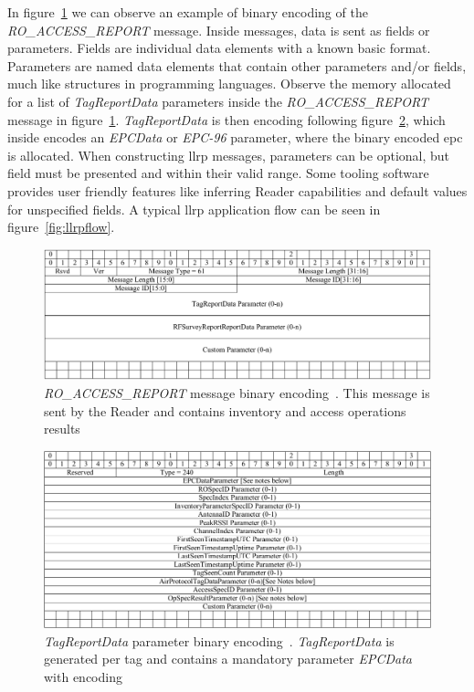 In figure~\ref{fig:ROACCESSREPORTbin} we can observe an example of binary encoding of the \textit{RO\_ACCESS\_REPORT} message.
Inside messages, data is sent as fields or parameters.
Fields are individual data elements with a known basic format.
Parameters are named data elements that contain other parameters and/or fields, much like structures in programming languages.
Observe the memory allocated for a list of \textit{TagReportData} parameters inside the \textit{RO\_ACCESS\_REPORT} message in figure~\ref{fig:ROACCESSREPORTbin}. \textit{TagReportData} is then encoding following figure~\ref{fig:TagReportDatabin}, which inside encodes an \textit{EPCData} or \textit{EPC-96} parameter, where the binary encoded \ac{epc} is allocated.
When constructing \ac{llrp} messages, parameters can be optional, but field must be presented and within their valid range. Some tooling software provides user friendly features like inferring Reader capabilities and default values for unspecified fields.
A typical \ac{llrp} application flow can be seen in figure~\ref{fig:llrpflow}.

\begin{figure}[]
    \centering
    \includegraphics[width=\textwidth]{./figs/02-state-of-the-art/RO_ACCESS_REPORT_bin.pdf}
    \caption{\textit{RO\_ACCESS\_REPORT} message binary encoding~\cite{LowLevelReader}. This message is sent by the Reader and contains inventory and access operations results} 
    \label{fig:ROACCESSREPORTbin}
\end{figure}

\begin{figure}[]
    \centering
    \includegraphics[width=\textwidth]{./figs/02-state-of-the-art/TagReportData_bin.pdf}
    \caption{\textit{TagReportData} parameter binary encoding~\cite{LowLevelReader}. \textit{TagReportData} is generated per tag and contains a mandatory parameter \textit{EPCData} with encoding} 
    \label{fig:TagReportDatabin}
\end{figure}


